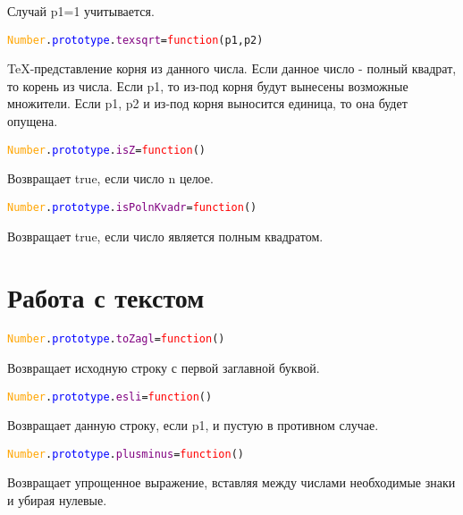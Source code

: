 \documentclass[a4paper,12pt]{article}
\begin{document}
	Случай p1=1 учитывается.
		\begin{alltt}
			\textcolor{Orange}{Number}.\textcolor{Blue}{prototype}.\textcolor{Purple}{texsqrt}=\textcolor{Red}{function}(p1,p2)
		\end{alltt}	
	TeX-представление корня из данного числа.
	Если данное число - полный квадрат, то корень из числа.
	Если p1, то из-под корня будут вынесены возможные множители.
	Если p1, p2 и из-под корня выносится единица, то она будет опущена.
		\begin{alltt}
			\textcolor{Orange}{Number}.\textcolor{Blue}{prototype}.\textcolor{Purple}{isZ}=\textcolor{Red}{function}()
		\end{alltt}	
	Возвращает true, если число n целое.
		\begin{alltt}
			\textcolor{Orange}{Number}.\textcolor{Blue}{prototype}.\textcolor{Purple}{isPolnKvadr}=\textcolor{Red}{function}()
		\end{alltt}	
	Возвращает true, если число является полным квадратом.
	\section{Работа с текстом}
		\begin{alltt}
			\textcolor{Orange}{Number}.\textcolor{Blue}{prototype}.\textcolor{Purple}{toZagl}=\textcolor{Red}{function}()
		\end{alltt}	
	Возвращает исходную строку с первой заглавной буквой.
		\begin{alltt}
			\textcolor{Orange}{Number}.\textcolor{Blue}{prototype}.\textcolor{Purple}{esli}=\textcolor{Red}{function}()
		\end{alltt}	
	Возвращает данную строку, если p1, и пустую в противном случае.
		\begin{alltt}
			\textcolor{Orange}{Number}.\textcolor{Blue}{prototype}.\textcolor{Purple}{plusminus}=\textcolor{Red}{function}()
		\end{alltt}	
	Возвращает упрощенное выражение, вставляя между числами необходимые знаки и убирая нулевые. 
\end{document}
